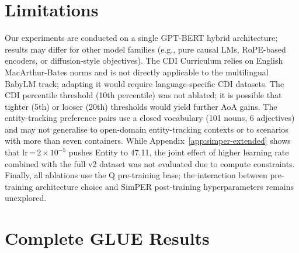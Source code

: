\documentclass[11pt]{article}
\begin{document}
\section*{Limitations}

Our experiments are conducted on a single GPT-BERT hybrid architecture;
results may differ for other model families (e.g., pure causal LMs,
RoPE-based encoders, or diffusion-style objectives).
The CDI Curriculum relies on English MacArthur-Bates norms and
is not directly applicable to the multilingual BabyLM track;
adapting it would require language-specific CDI datasets.
The CDI percentile threshold (10th percentile) was not ablated;
it is possible that tighter (5th) or looser (20th) thresholds
would yield further AoA gains.
The entity-tracking preference pairs use a closed vocabulary
(101 nouns, 6 adjectives) and may not generalise to open-domain
entity-tracking contexts or to scenarios with more than seven containers.
While Appendix~\ref{app:simper-extended} shows that lr\,=\,$2{\times}10^{-5}$
pushes Entity to 47.11, the joint effect of higher learning rate
combined with the full v2 dataset was not evaluated due to compute constraints.
Finally, all ablations use the Q pre-training base;
the interaction between pre-training architecture choice and
SimPER post-training hyperparameters remains unexplored.




\appendix

\section{Complete GLUE Results}
\label{app:glue}
\end{document}
